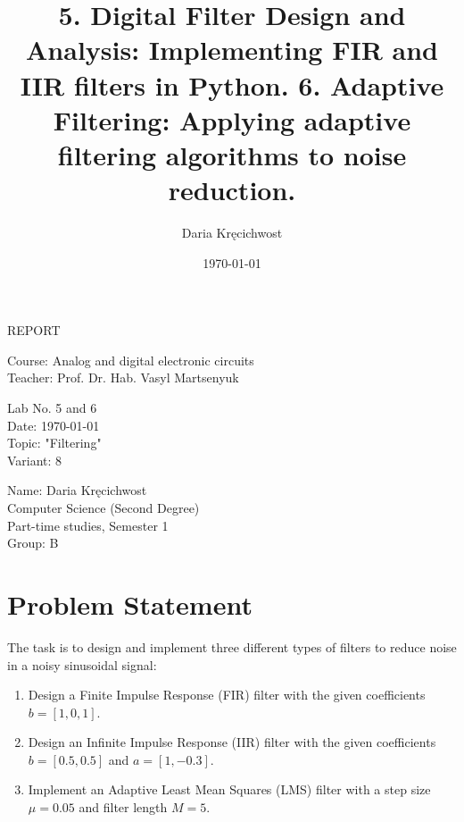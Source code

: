 \documentclass[a4paper,12pt]{article}
\begin{document}
\title{5. Digital Filter Design and Analysis: Implementing
 FIR and IIR filters in Python.
 6. Adaptive Filtering: Applying adaptive filtering
 algorithms to noise reduction.}
\author{Daria Kręcichwost}
\date{\today}

\begin{titlepage}
    \centering
    \vspace*{2cm}
    
    \Huge
    REPORT
    
    \vspace{1cm}
    
    \Large
    Course: Analog and digital electronic circuits \\
    Teacher: Prof. Dr. Hab. Vasyl Martsenyuk
    
    \vfill
    
    \Large
    Lab No. 5 and 6\\
    Date: \today \\
    Topic: "Filtering" \\
    Variant: 8
    
    \vspace{1cm}
    
    \large
    Name: Daria Kręcichwost \\
    Computer Science (Second Degree) \\
    Part-time studies, Semester 1 \\
    Group: B
\end{titlepage}

\newpage
\maketitle

\section{Problem Statement}
The task is to design and implement three different types of filters to reduce noise in a noisy sinusoidal signal:
\begin{enumerate}
    \item Design a Finite Impulse Response (FIR) filter with the given coefficients \( b = [1, 0, 1] \).
    \item Design an Infinite Impulse Response (IIR) filter with the given coefficients \( b = [0.5, 0.5] \) and \( a = [1, -0.3] \).
    \item Implement an Adaptive Least Mean Squares (LMS) filter with a step size \( \mu = 0.05 \) and filter length \( M = 5 \).
\end{enumerate}
\end{document}
